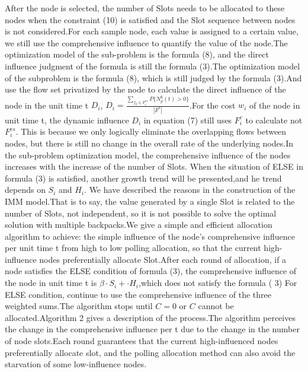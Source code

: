 \documentclass[conference,compsoc]{IEEEtran}
\begin{document}
After the node is selected, the number of Slots needs to be allocated to these nodes when the constraint (10) is satisfied and the Slot sequence between nodes is not considered.For each sample node, each value is assigned to a certain value, we still use the comprehensive influence to quantify the value of the node.The optimization model of the sub-problem is the formula (8), and the direct influence judgment of the formula is still the formula (3).The optimization model of the subproblem is the formula (8), which is still judged by the formula (3).And use the flow set privatized by the node to calculate the direct influence of the node in the unit time t $D_i$, $D_i=\frac{\sum_{f_k \in F^{cs}_i} P\{N_p^k(t)> 0\}}{|F^c|} $.For the cost $w_i$ of the node in unit time t, the dynamic influence $D_i$ in equation (7) still uses $F_i^c$ to calculate not $F^{cs}_i$. This is because we only logically eliminate the overlapping flows between nodes, but there is still no change in the overall rate of the underlying nodes.In the sub-problem optimization model, the comprehensive influence of the nodes increases with the increase of the number of Slots. When the situation of ELSE in formula (3) is satisfied, another growth trend will be presented,and he trend depends on $S_i$ and $H_i$. We have described the reasons in the construction of the IMM model.That is to say, the value generated by a single Slot is related to the number of Slots, not independent, so it is not possible to solve the optimal solution with multiple backpacks.We give a simple and efficient allocation algorithm to achieve: the simple influence of the node's comprehensive influence per unit time t from high to low polling allocation, so that the current high-influence nodes preferentially allocate Slot.After each round of allocation, if a node satisfies the ELSE condition of formula (3), the comprehensive influence of the node in unit time t is $\beta \cdot S_i + \cdot H_i$,which does not satisfy the formula ( 3) For ELSE condition, continue to use the comprehensive influence of the three weighted sums.The algorithm stops until $C = 0$ or $C$ cannot be allocated.Algorithm 2 gives a description of the process.The algorithm perceives the change in the comprehensive influence per t due to the change in the number of node slots.Each round guarantees that the current high-influenced nodes preferentially allocate slot, and the polling allocation method can also avoid the starvation of some low-influence nodes.
\end{document}

